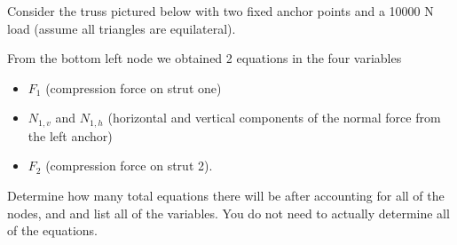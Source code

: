 \begin{applicationActivities}
\begin{activity}{10}
Consider the truss pictured below with two fixed anchor points and a 10000 N load (assume all triangles are equilateral).
\drawtruss

From the bottom left node we obtained 2 equations in the four variables
\begin{itemize}
\item $F_{1}$ (compression force on strut one)
\item $N_{1,v}$ and $N_{1,h}$ (horizontal and vertical components of the normal force from the left anchor)
\item $F_2$ (compression force on strut 2).
\end{itemize}

\begin{subactivity}
Determine how many total equations there will be after accounting for all of the nodes, and and list all of the variables.  You do not need to actually determine all of the equations.
\end{subactivity}
\end{activity}



\end{applicationActivities}
